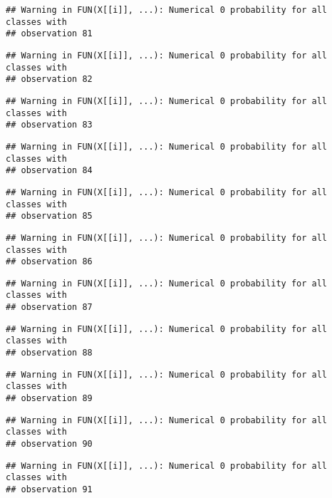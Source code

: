 \documentclass[
]{article}
\begin{document}
\begin{verbatim}
## Warning in FUN(X[[i]], ...): Numerical 0 probability for all classes with
## observation 81
\end{verbatim}

\begin{verbatim}
## Warning in FUN(X[[i]], ...): Numerical 0 probability for all classes with
## observation 82
\end{verbatim}

\begin{verbatim}
## Warning in FUN(X[[i]], ...): Numerical 0 probability for all classes with
## observation 83
\end{verbatim}

\begin{verbatim}
## Warning in FUN(X[[i]], ...): Numerical 0 probability for all classes with
## observation 84
\end{verbatim}

\begin{verbatim}
## Warning in FUN(X[[i]], ...): Numerical 0 probability for all classes with
## observation 85
\end{verbatim}

\begin{verbatim}
## Warning in FUN(X[[i]], ...): Numerical 0 probability for all classes with
## observation 86
\end{verbatim}

\begin{verbatim}
## Warning in FUN(X[[i]], ...): Numerical 0 probability for all classes with
## observation 87
\end{verbatim}

\begin{verbatim}
## Warning in FUN(X[[i]], ...): Numerical 0 probability for all classes with
## observation 88
\end{verbatim}

\begin{verbatim}
## Warning in FUN(X[[i]], ...): Numerical 0 probability for all classes with
## observation 89
\end{verbatim}

\begin{verbatim}
## Warning in FUN(X[[i]], ...): Numerical 0 probability for all classes with
## observation 90
\end{verbatim}

\begin{verbatim}
## Warning in FUN(X[[i]], ...): Numerical 0 probability for all classes with
## observation 91
\end{verbatim}
\end{document}

